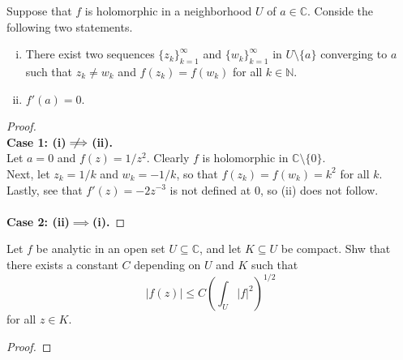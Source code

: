 \documentclass{article}
\newcommand{\notimplies}{%
  \mathrel{{\ooalign{\hidewidth$\not\phantom{=}$\hidewidth\cr$\implies$}}}}
\newenvironment{problem}[2][Problem]{\begin{trivlist}
\item[\hskip \labelsep {\bfseries #1}\hskip \labelsep {\bfseries #2.}]}{\end{trivlist}}
\begin{document}
\pagebreak

\begin{problem}{3}
  Suppose that $f$ is holomorphic in a neighborhood $U$ of $a \in \mathbb C$.
  Conside the following two statements.
  \begin{enumerate}[(i)]
    \item There exist two sequences $\{z_k\}_{k=1}^\infty$ and
    $\{w_k\}_{k=1}^\infty$ in $U \setminus \{a\}$ converging to $a$ such that
    $z_k \neq w_k$ and $f(z_k) = f(w_k)$ for all $k \in \mathbb N$.
    \item $f'(a) = 0$.
  \end{enumerate}
\end{problem}

\begin{proof} $ $\\
  \textbf{Case 1: (i)$\notimplies$(ii).}\\
  Let $a = 0$ and $f(z) = 1/z^2$. Clearly $f$ is holomorphic in
  $\mathbb C \setminus \{0\}$.
  \\
  Next, let $z_k = 1/k$ and $w_k = -1/k$, so that $f(z_k) = f(w_k) = k^2$ for
  all $k$.
  Lastly, see that $f'(z) = -2z^{-3}$ is not defined at $0$, so (ii) does not
  follow.
  \\~\\
  \textbf{Case 2: (ii)$\implies$(i).}
\end{proof}

\pagebreak

\begin{problem}{4}
  Let $f$ be analytic in an open set $U \subseteq \mathbb C$, and let
  $K \subseteq U$ be compact. Shw that there exists a constant $C$ depending on
  $U$ and $K$ such that \[
    |f(z)| \leq C\left(\int_U|f|^2\right)^{1/2}
  \] for all $z \in K$.
\end{problem}

\begin{proof}
\end{proof}
\end{document}
